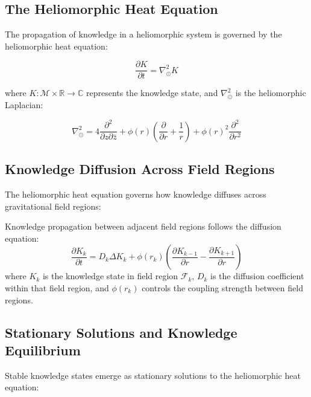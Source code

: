 \begin{definition}
\begin{theorem}
\section{The Heliomorphic Heat Equation}

The propagation of knowledge in a heliomorphic system is governed by the heliomorphic heat equation:

\begin{equation}
\frac{\partial K}{\partial t} = \nabla_{\odot}^2 K
\end{equation}

where $K: \mathcal{M} \times \mathbb{R} \rightarrow \mathbb{C}$ represents the knowledge state, and $\nabla_{\odot}^2$ is the heliomorphic Laplacian:

\begin{equation}
\nabla_{\odot}^2 = 4\frac{\partial^2}{\partial z \partial \bar{z}} + \phi(r)\left(\frac{\partial}{\partial r} + \frac{1}{r}\right) + \phi(r)^2\frac{\partial^2}{\partial r^2}
\end{equation}

\subsection{Knowledge Diffusion Across Field Regions}

The heliomorphic heat equation governs how knowledge diffuses across gravitational field regions:

\begin{theorem}
Knowledge propagation between adjacent field regions follows the diffusion equation:
\begin{equation}
\frac{\partial K_k}{\partial t} = D_k \Delta K_k + \phi(r_k) \left(\frac{\partial K_{k-1}}{\partial r} - \frac{\partial K_{k+1}}{\partial r}\right)
\end{equation}
where $K_k$ is the knowledge state in field region $\mathcal{F}_k$, $D_k$ is the diffusion coefficient within that field region, and $\phi(r_k)$ controls the coupling strength between field regions.
\end{theorem}

\subsection{Stationary Solutions and Knowledge Equilibrium}

Stable knowledge states emerge as stationary solutions to the heliomorphic heat equation:


\end{theorem}
\end{definition}
